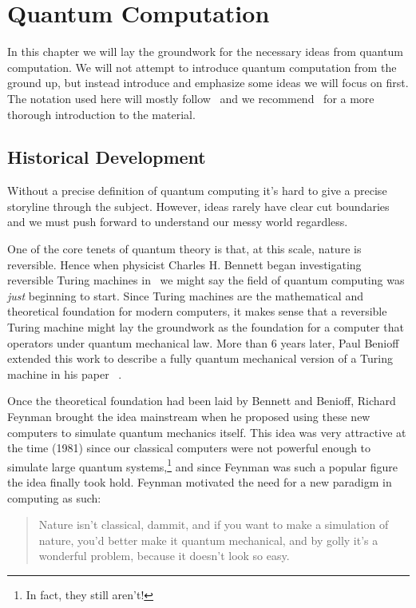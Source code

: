 \chapter{Quantum Computation}\label{ch:computation}

In this chapter we will lay the groundwork for the necessary ideas from quantum computation.
We will not attempt to introduce quantum computation from the ground up, but instead introduce and emphasize some ideas we will focus on first.
The notation used here will mostly follow~\cite{watroustqi} and we recommend~\cite{nielsenchuang} for a more thorough introduction to the material.

\section{Historical Development}
Without a precise definition of quantum computing it's hard to give a precise storyline through the subject.
However, ideas rarely have clear cut boundaries and we must push forward to understand our messy world regardless.

One of the core tenets of quantum theory is that, at this scale, nature is reversible.
Hence when physicist Charles H. Bennett began investigating reversible Turing machines in~\cite{reversibleturing} we might say the field of quantum computing was \emph{just} beginning to start.
Since Turing machines are the mathematical and theoretical foundation for modern computers, it makes sense that a reversible Turing machine might lay the groundwork as the foundation for a computer that operators under quantum mechanical law.
More than 6 years later, Paul Benioff extended this work to describe a fully quantum mechanical version of a Turing machine in his paper ~\cite{quantumturing}.

Once the theoretical foundation had been laid by Bennett and Benioff, Richard Feynman brought the idea mainstream when he proposed using these new computers to simulate quantum mechanics itself.
This idea was very attractive at the time (1981) since our classical computers were not powerful enough to simulate large quantum systems,\footnote{In fact, they still aren't!} and since Feynman was such a popular figure the idea finally took hold.
Feynman motivated the need for a new paradigm in computing as such:
\begin{quote}
    Nature isn't classical, dammit, and if you want to make a simulation of nature, you'd better make it quantum mechanical, and by golly it's a wonderful problem, because it doesn't look so easy.
\end{quote}

